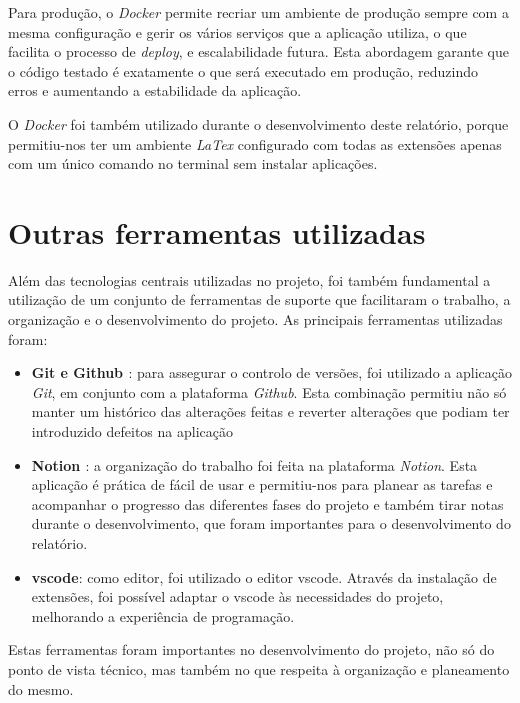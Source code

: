 Para produção, o \textit{Docker} permite recriar um ambiente de produção sempre com a mesma configuração e gerir os vários serviços que a aplicação utiliza, o que facilita o processo de \textit{deploy}, e escalabilidade futura. Esta abordagem garante que o código testado é exatamente o que será executado em produção, reduzindo erros e aumentando a estabilidade da aplicação.

O \textit{Docker}\cite{docker} foi também utilizado durante o desenvolvimento deste relatório, porque permitiu-nos ter um ambiente \textit{LaTex} configurado com todas as extensões apenas com um único comando no terminal sem instalar aplicações.

\section{Outras ferramentas utilizadas}
\label{sec:tools}

Além das tecnologias centrais utilizadas no projeto, foi também fundamental a utilização de um conjunto de ferramentas de suporte que facilitaram o trabalho, a organização e o desenvolvimento do projeto. As principais ferramentas utilizadas foram:

\begin{itemize}
    \item \textbf{Git \cite{git} e Github \cite{github}}: para assegurar o controlo de versões, foi utilizado a aplicação \textit{Git}, em conjunto com a plataforma \textit{Github}. Esta combinação permitiu não só manter um histórico das alterações feitas e reverter alterações que podiam ter introduzido defeitos na aplicação

    \item \textbf{Notion \cite{notion}}: a organização do trabalho foi feita na plataforma \textit{Notion}. Esta aplicação é prática de fácil de usar e permitiu-nos para planear as tarefas e acompanhar o progresso das diferentes fases do projeto e também tirar notas durante o desenvolvimento, que foram importantes para o desenvolvimento do relatório.

    \item \textbf{\gls{vscode}\cite{vscode}}: como editor, foi utilizado o editor \gls{vscode}. Através da instalação de extensões, foi possível adaptar o \gls{vscode} às necessidades do projeto, melhorando a experiência de programação.
\end{itemize}

Estas ferramentas foram importantes no desenvolvimento do projeto, não só do ponto de vista técnico, mas também no que respeita à organização e planeamento do mesmo.
